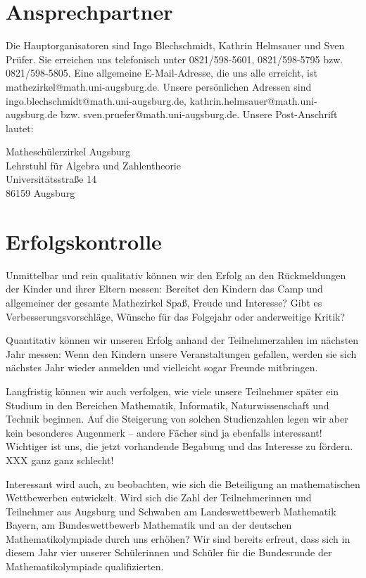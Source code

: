 \documentclass[12pt]{zettel}
\begin{document}
\section{Ansprechpartner}

Die Hauptorganisatoren sind Ingo Blechschmidt, Kathrin Helmsauer und Sven
Prüfer. Sie erreichen uns telefonisch unter 0821/598-5601, 0821/598-5795 bzw.
0821/598-5805. Eine allgemeine E-Mail-Adresse, die uns alle erreicht, ist
\textsf{mathezirkel@math.uni-augsburg.de}. Unsere persönlichen Adressen sind
\textsf{ingo.blechschmidt@math.uni-augsburg.de},
\textsf{kathrin.helmsauer@math.uni-augsburg.de} bzw.
\textsf{sven.pruefer@math.uni-augsburg.de}. Unsere Post-Anschrift lautet:

\begin{tabbing}
  Matheschülerzirkel Augsburg \\
  Lehrstuhl für Algebra und Zahlentheorie \\
  Universitätsstraße 14 \\
  86159 Augsburg
\end{tabbing}


\section{Erfolgskontrolle}

Unmittelbar und rein qualitativ können wir den Erfolg an den Rückmeldungen der
Kinder und ihrer Eltern messen: Bereitet den Kindern das Camp und allgemeiner der
gesamte Mathezirkel Spaß, Freude und Interesse? Gibt es
Verbesserungsvorschläge, Wünsche für das Folgejahr oder anderweitige Kritik?

Quantitativ können wir unseren Erfolg anhand der Teilnehmerzahlen im nächsten
Jahr messen: Wenn den Kindern unsere Veranstaltungen gefallen, werden sie sich
nächstes Jahr wieder anmelden und vielleicht sogar Freunde mitbringen.

Langfristig können wir auch verfolgen, wie viele unsere Teilnehmer später ein
Studium in den Bereichen Mathematik, Informatik, Naturwissenschaft und Technik
beginnen. Auf die Steigerung von solchen Studienzahlen legen wir aber kein
besonderes Augenmerk -- andere Fächer sind ja ebenfalls interessant! Wichtiger
ist uns, die jetzt vorhandende Begabung und das Interesse zu fördern. XXX ganz
ganz schlecht!

Interessant wird auch, zu beobachten, wie sich die Beteiligung an
mathematischen Wettbewerben entwickelt. Wird sich die Zahl der
Teilnehmerinnen und Teilnehmer aus Augsburg und Schwaben am Landeswettbewerb
Mathematik Bayern, am Bundeswettbewerb Mathematik und an der deutschen
Mathematikolympiade durch uns erhöhen? Wir sind bereits erfreut,
dass sich in diesem Jahr vier unserer Schülerinnen und Schüler für die
Bundesrunde der Mathematikolympiade qualifizierten.
\end{document}
